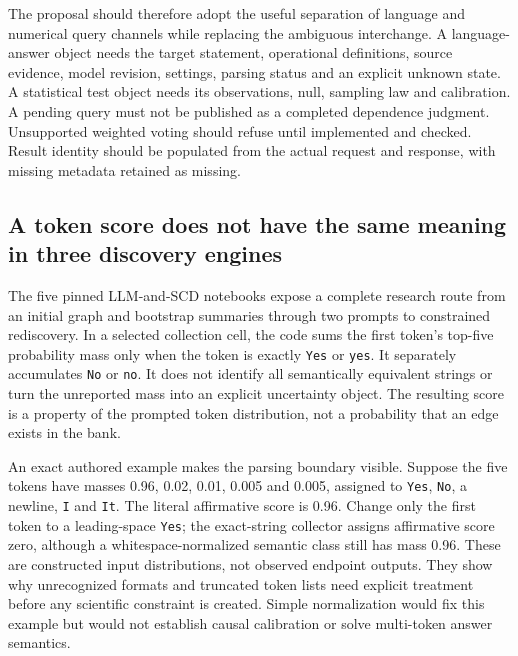 The proposal should therefore adopt the useful separation of language
and numerical query channels while replacing the ambiguous interchange.
A language-answer object needs the target statement, operational
definitions, source evidence, model revision, settings, parsing status
and an explicit unknown state. A statistical test object needs its
observations, null, sampling law and calibration. A pending query must
not be published as a completed dependence judgment. Unsupported
weighted voting should refuse until implemented and checked. Result
identity should be populated from the actual request and response, with
missing metadata retained as missing.

\hypertarget{a-token-score-does-not-have-the-same-meaning-in-three-discovery-engines}{%
\subsection{A token score does not have the same meaning in three
discovery
engines}\label{a-token-score-does-not-have-the-same-meaning-in-three-discovery-engines}}

The five pinned LLM-and-SCD notebooks expose a complete research route
from an initial graph and bootstrap summaries through two prompts to
constrained rediscovery. In a selected collection cell, the code sums
the first token's top-five probability mass only when the token is
exactly \texttt{Yes} or \texttt{yes}. It separately accumulates
\texttt{No} or \texttt{no}. It does not identify all semantically
equivalent strings or turn the unreported mass into an explicit
uncertainty object. The resulting score is a property of the prompted
token distribution, not a probability that an edge exists in the bank.
\citep{exec14_iid_scd}

An exact authored example makes the parsing boundary visible. Suppose
the five tokens have masses 0.96, 0.02, 0.01, 0.005 and 0.005, assigned
to \texttt{Yes}, \texttt{No}, a newline, \texttt{I} and \texttt{It}. The
literal affirmative score is 0.96. Change only the first token to a
leading-space \texttt{Yes}; the exact-string collector assigns
affirmative score zero, although a whitespace-normalized semantic class
still has mass 0.96. These are constructed input distributions, not
observed endpoint outputs. They show why unrecognized formats and
truncated token lists need explicit treatment before any scientific
constraint is created. Simple normalization would fix this example but
would not establish causal calibration or solve multi-token answer
semantics. \citep{exec14_iid_oracle}

